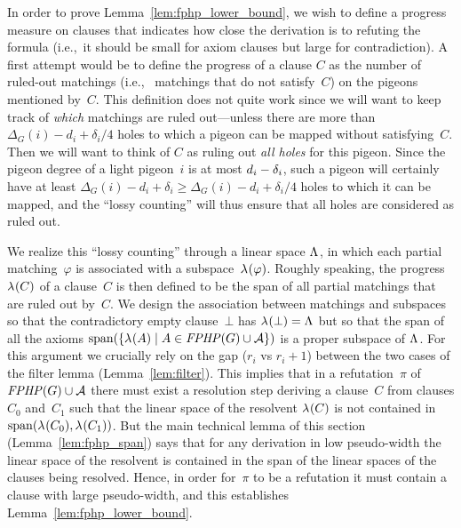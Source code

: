 \documentclass{theoretics}
\newcommand{\set}[1]{\{ #1 \}}
\newcommand{\setdescr}[3][\mid]{\set{ #2 #1 #3 }}
\newcommand{\ie}{i.e.,\ }
\newcommand{\reflem}[1]{Lemma~\ref{#1}}
\newcommand{\refpi}{\pi}
\newcommand{\emptycl}{\bot}
\newcommand{\formulaformat}[1]{\mathit{#1}}
\newcommand{\graphfphpnot}[1][G]{\formulaformat{FPHP}({#1})}
\newcommand{\light}{light\xspace}
\newcommand{\GFPHP}{G\text{-}FPHP}
\renewcommand{\GFPHP}{\graphfphpnot[G]}
\renewcommand{\deg}[2][XXXXXXXXXXXX]{\Delta_{#1}(#2)}
\newcommand{\dimLi}{\deg[G]{i} - d_i + \delta_i/4}
\newcommand{\Ax}{\ensuremath\mathcal{A}}
\newcommand{\thr}[1]{ \ensuremath d_{{#1}} }
\newcommand{\adv}[1]{\delta_{{#1}}}
\newcommand{\linspace}[1][]{\ensuremath \Lambda_{{#1}}}
\newcommand{\linmap}[1][]{\ensuremath \lambda_{{#1}}}
\newcommand{\linmapof}[2][]{\linmap[#1](#2)}
\newcommand{\pseudowidth}{pseudo-width\xspace}
\newcommand{\matcha}{\varphi}
\newcommand{\spans}[1]{\mathrm{span} ( #1 )}
\numberwithin{equation}{section}
\begin{document}
In order to prove \reflem{lem:fphp_lower_bound}, we wish to define a
progress measure on clauses that indicates how close the derivation is
to refuting the formula (\ie it should be small for axiom clauses but
large for contradiction). A first attempt would be to define the
progress of a clause $C$ as the number of ruled-out matchings (\ie
matchings that do not satisfy~$C$) on the pigeons mentioned
by~$C$. This definition does not quite work since we will want to keep
track of \emph{which} matchings are ruled out---unless there are more
than~$\dimLi$ holes to which a pigeon can be mapped without
satisfying~$C$. Then we will want to think of $C$ as ruling out
\emph{all holes} for this pigeon. Since the pigeon degree of a \light
pigeon~$i$ is at most $\thr{i} - \adv{i}$, such a pigeon will
certainly have at least $ \deg[G]{i} - d_i + \delta_i \geq \dimLi$
holes to which it can be mapped, and the ``lossy counting'' will thus
ensure that all holes are considered as ruled out.

We realize this ``lossy counting'' through a linear space $\linspace$,
in which each partial matching~$\matcha$ is associated with a
subspace~$\linmapof{\matcha}$.  Roughly speaking, the
progress~$\linmapof{C}$ of a clause~$C$ is then defined to be the span
of all partial matchings that are ruled out by~$C$.  We design the
association between matchings and subspaces so that the contradictory
empty clause~$\emptycl$ has $\linmapof{\emptycl} = \linspace$ but so
that the span of all the axioms
$\spans{\setdescr{ \linmapof{A}}{A \in \GFPHP \cup \Ax}}$ is a proper
subspace of $\linspace$. For this argument we crucially rely on the
gap ($r_i$ vs $r_i + 1$) between the two cases of the filter lemma
(\reflem{lem:filter}). This implies that in a refutation~$\refpi$ of
$ \GFPHP \cup \Ax $ there must exist a resolution step deriving a
clause~$C$ from clauses $C_0$ and~$C_1$ such that the linear space of
the resolvent $\linmapof{C}$ is not contained in
$\spans{\linmapof{C_0}, \linmapof{C_1}}$.  But the main technical
lemma of this section (\reflem{lem:fphp_span}) says that for any
derivation in low \pseudowidth the linear space of the resolvent is
contained in the span of the linear spaces of the clauses being
resolved. Hence, in order for~$\refpi$ to be a refutation it must
contain a clause with large \pseudowidth, and this establishes
\reflem{lem:fphp_lower_bound}.
\end{document}
